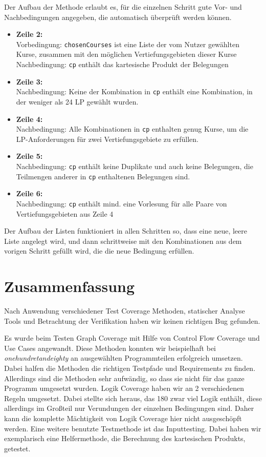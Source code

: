\documentclass[ngerman]{article}
\begin{document}
Der Aufbau der Methode erlaubt es, für die einzelnen Schritt gute Vor- und Nachbedingungen angegeben, die automatisch überprüft werden können.
\begin{itemize}
    \item
        \textbf{Zeile 2:} \\
        Vorbedingung: \texttt{chosenCourses} ist eine Liste der vom Nutzer gewählten Kurse, zusammen mit den möglichen Vertiefungsgebieten dieser Kurse
        Nachbedingung: \texttt{cp} enthält das kartesische Produkt der Belegungen
    \item
        \textbf{Zeile 3:} \\
        Nachbedingung: Keine der Kombination in \texttt{cp} enthält eine Kombination, in der weniger als 24 LP gewählt wurden.
    \item
        \textbf{Zeile 4:} \\
        Nachbedingung: Alle Kombinationen in \texttt{cp} enthalten genug Kurse, um die LP-Anforderungen für zwei Vertiefungsgebiete zu erfüllen.
    \item
        \textbf{Zeile 5:} \\
        Nachbedingung: \texttt{cp} enthält keine Duplikate und auch keine Belegungen, die Teilmengen anderer in \texttt{cp} enthaltenen Belegungen sind.
    \item
        \textbf{Zeile 6:} \\
        Nachbedingung: \texttt{cp} enthält mind. eine Vorlesung für alle Paare von Vertiefungsgebieten aus Zeile 4
\end{itemize}
Der Aufbau der Listen funktioniert in allen Schritten so, dass eine neue, leere Liste angelegt wird, und dann schrittweise mit den Kombinationen aus dem vorigen Schritt gefüllt wird, die die neue Bedingung erfüllen.

\section{Zusammenfassung}

Nach Anwendung verschiedener Test Coverage Methoden, statischer Analyse Tools und Betrachtung der Verifikation haben wir keinen richtigen Bug gefunden. 

Es wurde beim Testen Graph Coverage mit Hilfe von Control Flow Coverage und Use Cases angewandt. Diese Methoden konnten wir beispielhaft bei \emph{onehundretandeighty} an ausgewählten Programmteilen erfolgreich umsetzen. Dabei halfen die Methoden die richtigen Testpfade und Requirements zu finden. Allerdings sind die Methoden sehr aufwändig, so dass sie nicht für das ganze Programm umgesetzt wurden. Logik Coverage haben wir an 2 verschiedenen Regeln umgesetzt. Dabei stellte sich heraus, das 180 zwar viel Logik enthält, diese allerdings im Großteil nur Verundungen der einzelnen Bedingungen sind. Daher kann die komplette Mächtigkeit von Logik Coverage hier nicht ausgeschöpft werden.
Eine weitere benutzte Testmethode ist das Inputtesting. Dabei haben wir exemplarisch eine Helfermethode, die Berechnung des kartesischen Produkts, getestet.  
\end{document}
